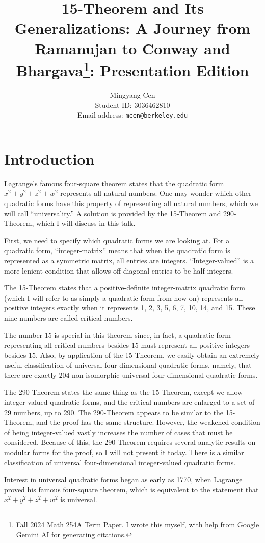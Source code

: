 \documentclass[letterpaper, 12pt]{article}
\title{15-Theorem and Its Generalizations: A Journey from Ramanujan to Conway and Bhargava\footnote{Fall 2024 Math 254A Term Paper. I wrote this myself, with help from Google Gemini AI for generating citations.}: Presentation Edition}
\author{Mingyang Cen \\ Student ID: 3036462810 \\ Email address: \texttt{mcen@berkeley.edu}}
\begin{document}
\maketitle

\section{Introduction}
Lagrange's famous four-square theorem states that the quadratic form $x^2+y^2+z^2+w^2$ represents all natural numbers. One may wonder which other quadratic forms have this property of representing all natural numbers, which we will call ``universality.'' A solution is provided by the 15-Theorem and 290-Theorem, which I will discuss in this talk.

First, we need to specify which quadratic forms we are looking at. For a quadratic form, ``integer-matrix'' means that when the quadratic form is represented as a symmetric matrix, all entries are integers. ``Integer-valued'' is a more lenient condition that allows off-diagonal entries to be half-integers.

The 15-Theorem states that a positive-definite integer-matrix quadratic form (which I will refer to as simply a quadratic form from now on) represents all positive integers exactly when it represents 1, 2, 3, 5, 6, 7, 10, 14, and 15. These nine numbers are called critical numbers.

The number 15 is special in this theorem since, in fact,
a quadratic form representing all critical numbers besides $15$ must represent all positive integers besides $15$.
Also, by application of the 15-Theorem, we easily obtain an extremely useful classification of universal four-dimensional quadratic forms, namely, that there are exactly $204$ non-isomorphic universal four-dimensional quadratic forms.

The 290-Theorem states the same thing as the 15-Theorem, except we allow integer-valued quadratic forms, and the critical numbers are enlarged to a set of 29 numbers, up to 290.
The 290-Theorem appears to be similar to the 15-Theorem, and the proof has the same structure. However, the weakened condition of being integer-valued vastly increases the number of cases that must be considered. Because of this, the 290-Theorem requires several analytic results on modular forms for the proof, so I will not present it today.
There is a similar classification of universal four-dimensional integer-valued quadratic forms.

Interest in universal quadratic forms began as early as 1770, when Lagrange proved his famous four-square theorem, which is equivalent to the statement that $x^2 + y^2 + z^2 + w^2$ is universal.
\end{document}
